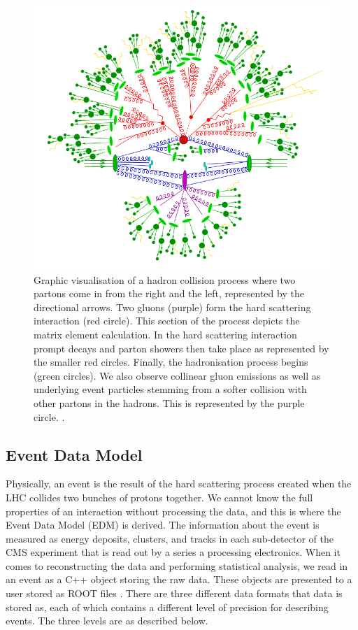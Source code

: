 \begin{figure} [p!] 
\begin{center}
\includegraphics[scale=0.55]{Figures/HadronCollisionProcess.png}
\end{center}
\caption{Graphic visualisation of a hadron collision process where two partons come in from the right and the left, represented by the directional arrows. Two gluons (purple) form the hard scattering interaction (red circle). This section of the process depicts the matrix element calculation. In the hard scattering interaction prompt decays and parton showers then take place as represented by the smaller red circles. Finally, the hadronisation process begins (green circles). We also observe collinear gluon emissions as well as underlying event particles stemming from a softer collision with other partons in the hadrons. This is represented by the purple circle. \cite{HadronCollisionProcess}.}
\label{fig-HadronCollisionProcess}
\end{figure}

\subsection{Event Data Model}

Physically, an event is the result of the hard scattering process created when the LHC collides two bunches of protons together. We cannot know the full properties of an interaction without processing the data, and this is where the Event Data Model (EDM) is derived. The information about the event is measured as energy deposits, clusters, and tracks in each sub-detector of the CMS experiment that is read out by a series a processing electronics. When it comes to reconstructing the data and performing statistical analysis, we read in an event as a C++ object storing the raw data. These objects are presented to a user stored as ROOT files \cite{Brun199781}. There are three different data formats that data is stored as, each of which contains a different level of precision for describing events. The three levels are as described below.

